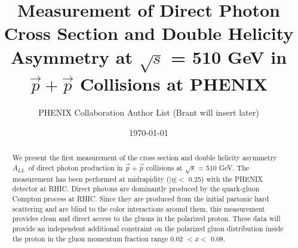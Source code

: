 \documentclass[twocolumn,letterpaper,aps,prl,longbibliography,superscriptaddress,floatfix]{revtex4-2}
\newcommand{\ALL}{\ensuremath{A_{LL}}}
\begin{document}


\title{Measurement of Direct Photon Cross Section and Double Helicity Asymmetry at $\sqrt{s}$ = 510 GeV in $\vec{p}+\vec{p}$ Collisions at PHENIX}

\author{PHENIX Collaboration Author List (Brant will insert later)}

\date{\today}

\begin{abstract}
We present the first measurement of the cross section and double helicity asymmetry \ALL\ of direct photon production in $\vec{p}+\vec{p}$ collisions at $\sqrt{s}$ = 510 GeV. The measurement has been performed at midrapidity ($|\eta| <$ 0.25) with the PHENIX detector at RHIC. Direct photons are dominantly produced by the quark-gluon Compton process at RHIC. Since they are produced from the initial partonic hard scattering and are blind to the color interactions around them, this measurement provides clean and direct access to the gluons in the polarized proton. These data will provide an independent additional constraint on the polarized gluon distribution inside the proton in the gluon momentum fraction range 0.02 $< x <$ 0.08.
\end{abstract}

	
\maketitle

\end{document}
